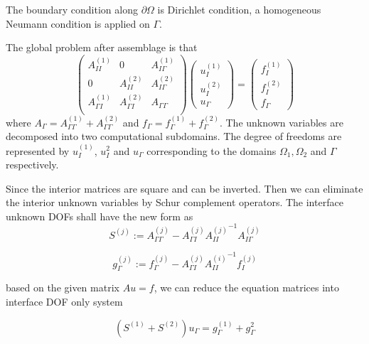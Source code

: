 The boundary condition along $ \partial \Omega  $ is Dirichlet condition, a homogeneous Neumann condition is applied on $ \Gamma $.

The global problem after assemblage is that
\begin{equation}
\begin{pmatrix}
A_{II}^{(1)} & 0 & A_{I\Gamma}^{(1)} \\
0 & A_{II}^{(2)} & A_{I\Gamma}^{(2)} \\
A_{\Gamma I}^{(1)} & A_{\Gamma I}^{(2)} & A_{\Gamma \Gamma}\\
\end{pmatrix} \begin{pmatrix}
u_{I}^{(1)} \\ u_{I}^{(2)} \\ u_{\Gamma}
\end{pmatrix} = \begin{pmatrix}
f_{I}^{(1)} \\ f_{I}^{(2)} \\ f_{\Gamma}
\end{pmatrix}
\end{equation}
where $ A_{\Gamma} = A_{\Gamma \Gamma}^{(1)} + A_{\Gamma \Gamma}^{(2)} $ and $ f_{\Gamma} = f_{\Gamma}^{(1)} + f_{\Gamma}^{(2)} $. The unknown variables are decomposed into two computational subdomains. The degree of freedoms are represented by $ u_{I}^{(1)} $, $ u_{I}^{2} $ and $ u_{\Gamma} $ corresponding to the domains $ \Omega_{1}, \Omega_{2} $ and $ \Gamma $ respectively.

Since the interior matrices are square and can be inverted. Then we can eliminate the interior unknown variables by Schur complement operators. The interface unknown DOFs shall have the new form as
\begin{equation}
S^{(j)} := A_{\Gamma \Gamma}^{(j)} - A_{\Gamma I}^{(j)} {A_{II}^{(j)}}^{-1}A_{I \Gamma}^{(j)}
\end{equation}

\begin{equation}
g_{\Gamma}^{(j)} := f_{\Gamma}^{(j)} - A_{\Gamma I}^{(j)} {A_{II}^{(i)}}^{-1} f_{I}^{(j)}
\end{equation}

based on the given matrix $ Au = f $, we can reduce the equation matrices into interface DOF only system

\begin{equation}
(S^{(1)} + S^{(2)}) u_{\Gamma} = g_{\Gamma}^{(1)} + g_{\Gamma}^{2}
\end{equation}

